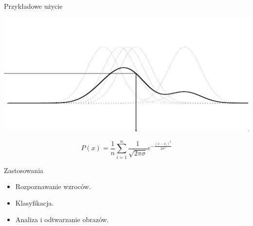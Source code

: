 \begin{frame}{Przykładowe użycie}
	
\begin{center}
\includegraphics[keepaspectratio=true, scale=0.55]{parzen_small}
\end{center}
	
	
\begin{equation}
	P(x) = \frac{1}{n}\sum_{i=1}^n\frac{1}{\sqrt{2\pi\sigma}}e^{-\frac{(x-x_i)^2}{2\sigma^2}}
\end{equation}
\end{frame}



\begin{frame}{Zastosowania}
\begin{itemize}
	\item Rozpoznawanie wzroców.
	\item Klasyfikacja.
	\item Analiza i odtwarzanie obrazów.

\end{itemize}
\end{frame}



	

